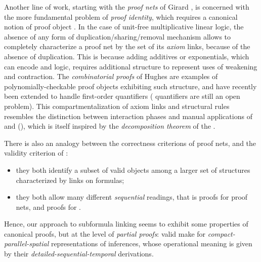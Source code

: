 Another line of work, starting with the \emph{proof nets} of Girard
, is concerned with the more fundamental problem of
\emph{proof identity}, which requires a canonical notion of proof object
. In the case of unit-free multiplicative
linear logic, the absence of any form of duplication/sharing/removal mechanism
allows to completely characterize a proof net by the set of its \emph{axiom}
links,
because of the absence of duplication. This is because adding additives or
exponentials, which can encode  and  logic, requires
additional structure to represent uses of weakening and contraction. The
\emph{combinatorial proofs} of Hughes
 are examples of
polynomially-checkable proof objects exhibiting such structure, and have
recently been extended to handle first-order  quantifiers
 ( quantifiers are still an open
problem). This compartmentalization of axiom links and structural rules
resembles the distinction between interaction phases and manual applications of
{} and {} (), which is itself inspired by
the \emph{decomposition theorem} of the 
.

There is also an analogy between the correctness criterions of proof nets, and
the validity criterion of :
\begin{itemize}
  \item they both identify a subset of valid objects among a larger set of
  structures characterized by links on formulas;
  \item they both allow many different \emph{sequential} readings, that is
   proofs for proof nets, and  proofs for
  .
\end{itemize}
Hence, our approach to subformula linking seems to exhibit some properties of
canonical proofs, but at the level of \emph{partial proofs}: valid  make
for \emph{compact-parallel-spatial} representations of inferences, whose
operational meaning is given by their \emph{detailed-sequential-temporal} 
derivations.


